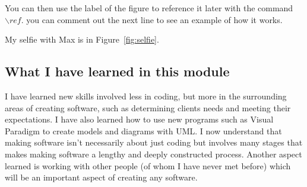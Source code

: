 You can then use the label of the figure to reference it later with the command ${\backslash}ref.$ you can comment out the next line to see an example of how it works.

 My selfie with Max is in  Figure~\ref{fig:selfie}.

\subsection{What I have learned in this module}
I have learned new skills involved less in coding, but more in the surrounding areas of creating software, such as determining clients needs and meeting their expectations. I have also learned how to use new programs such as Visual Paradigm to create models and diagrams with UML. I now understand that making software isn't necessarily about just coding but involves many stages that makes making software a lengthy and deeply constructed process. Another aspect learned is working with other people (of whom I have never met before) which will be an important aspect of creating any software.
